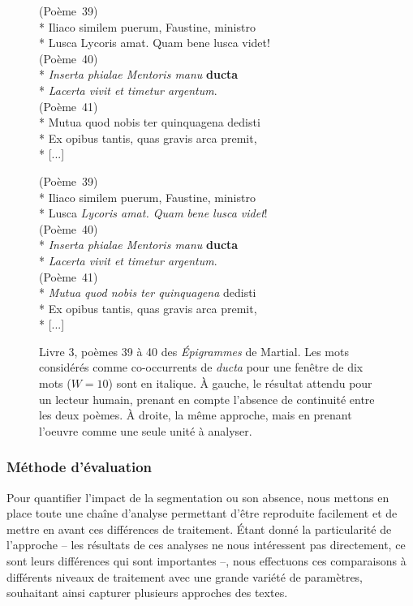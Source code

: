 \begin{figure}
\small
\begin{minipage}[t]{0.45\textwidth}
(Poème~39)\\*
Iliaco similem puerum, Faustine, ministro\\*
Lusca Lycoris amat. Quam bene lusca videt!\\
(Poème~40)\\*
\textit{Inserta phialae Mentoris manu} \textbf{ducta}\\*
\textit{Lacerta vivit et timetur argentum}.\\
(Poème~41)\\*
Mutua quod nobis ter quinquagena dedisti\\*
Ex opibus tantis, quas gravis arca premit,\\* {[...]}
\end{minipage} \hfill
\begin{minipage}[t]{0.45\textwidth}
(Poème~39)\\*
Iliaco similem puerum, Faustine, ministro\\*
Lusca \textit{Lycoris amat. Quam bene lusca videt}!\\
(Poème~40)\\*
\textit{Inserta phialae Mentoris manu} \textbf{ducta}\\*
\textit{Lacerta vivit et timetur argentum}.\\
(Poème~41)\\*
\textit{Mutua quod nobis ter quinquagena} dedisti\\*
Ex opibus tantis, quas gravis arca premit,\\*  {[...]}
\end{minipage}
\caption{Livre 3, poèmes 39 à 40 des \textit{Épigrammes} de Martial. Les mots considérés comme co-occurrents de \textit{ducta} pour une fenêtre de dix mots ($W=10$) sont en italique. À gauche, le résultat attendu pour un lecteur humain, prenant en compte l'absence de continuité entre les deux poèmes. À droite, la même approche, mais en prenant l'oeuvre comme une seule unité à analyser.}
\label{exc:epigrams}
\end{figure}


\subsubsection{Méthode d'évaluation}

Pour quantifier l'impact de la segmentation ou son absence, nous mettons en place toute une chaîne d'analyse permettant d'être reproduite facilement et de mettre en avant ces différences de traitement. Étant donné la particularité de l'approche -- les résultats de ces analyses ne nous intéressent pas directement, ce sont leurs différences qui sont importantes --, nous effectuons ces comparaisons à différents niveaux de traitement avec une grande variété de paramètres, souhaitant ainsi capturer plusieurs approches des textes.


